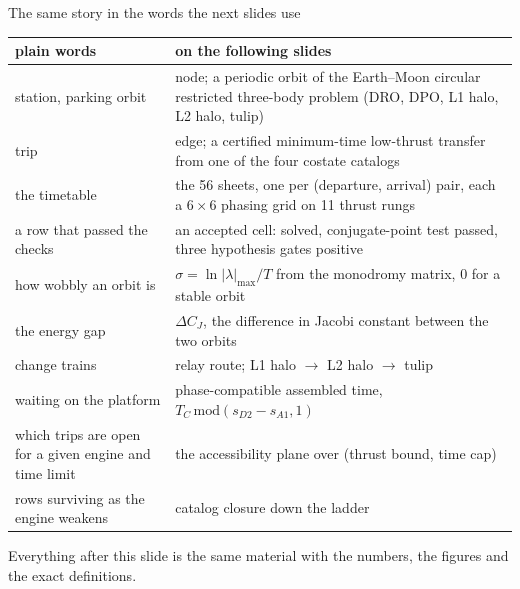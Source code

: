 \documentclass[aspectratio=169,10pt]{beamer}
\begin{document}
\begin{frame}{The same story in the words the next slides use}
  \footnotesize
  \setlength\tabcolsep{6pt}
  \renewcommand{\arraystretch}{1.2}
  \begin{tabular}{@{}p{}p{}@{}}
    \toprule
    plain words & on the following slides \\
    \midrule
    station, parking orbit & node; a periodic orbit of the Earth--Moon circular restricted three-body problem (DRO, DPO, L1 halo, L2 halo, tulip) \\
    trip & edge; a certified minimum-time low-thrust transfer from one of the four costate catalogs \\
    the timetable & the 56 sheets, one per (departure, arrival) pair, each a $6\times6$ phasing grid on 11 thrust rungs \\
    a row that passed the checks & an accepted cell: solved, conjugate-point test passed, three hypothesis gates positive \\
    how wobbly an orbit is & $\sigma = \ln|\lambda|_{\max}/T$ from the monodromy matrix, 0 for a stable orbit \\
    the energy gap & $\Delta C_J$, the difference in Jacobi constant between the two orbits \\
    change trains & relay route; L1 halo $\to$ L2 halo $\to$ tulip \\
    waiting on the platform & phase-compatible assembled time, $T_C\,\mathrm{mod}(s_{D2}-s_{A1},1)$ \\
    which trips are open for a given engine and time limit & the accessibility plane over (thrust bound, time cap) \\
    rows surviving as the engine weakens & catalog closure down the ladder \\
    \bottomrule
  \end{tabular}
  \vspace{4pt}

  \small Everything after this slide is the same material with the numbers, the figures and the exact definitions.
\end{frame}

\end{document}
